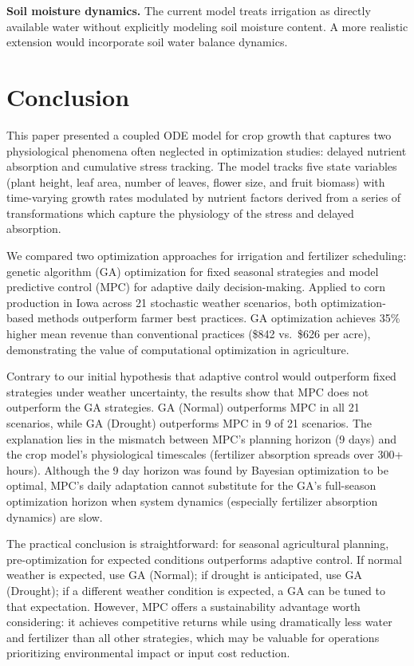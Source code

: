 \documentclass[preprint,12pt]{elsarticle}
\begin{document}
\textbf{Soil moisture dynamics.} The current model treats irrigation as directly available water without explicitly modeling soil moisture content. A more realistic extension would incorporate soil water balance dynamics.

\section{Conclusion}\label{sec:conclusion}

This paper presented a coupled ODE model for crop growth that captures two physiological phenomena often neglected in optimization studies: delayed nutrient absorption and cumulative stress tracking. The model tracks five state variables (plant height, leaf area, number of leaves, flower size, and fruit biomass) with time-varying growth rates modulated by nutrient factors derived from a series of transformations which capture the physiology of the stress and delayed absorption.

We compared two optimization approaches for irrigation and fertilizer scheduling: genetic algorithm (GA) optimization for fixed seasonal strategies and model predictive control (MPC) for adaptive daily decision-making. Applied to corn production in Iowa across 21 stochastic weather scenarios, both optimization-based methods outperform farmer best practices. GA optimization achieves 35\% higher mean revenue than conventional practices (\$842 vs.\ \$626 per acre), demonstrating the value of computational optimization in agriculture.

Contrary to our initial hypothesis that adaptive control would outperform fixed strategies under weather uncertainty, the results show that MPC does not outperform the GA strategies. GA (Normal) outperforms MPC in all 21 scenarios, while GA (Drought) outperforms MPC in 9 of 21 scenarios. The explanation lies in the mismatch between MPC's planning horizon (9 days) and the crop model's physiological timescales (fertilizer absorption spreads over 300+ hours). Although the 9 day horizon was found by Bayesian optimization to be optimal, MPC's daily adaptation cannot substitute for the GA's full-season optimization horizon when system dynamics (especially fertilizer absorption dynamics) are slow.

The practical conclusion is straightforward: for seasonal agricultural planning, pre-optimization for expected conditions outperforms adaptive control. If normal weather is expected, use GA (Normal); if drought is anticipated, use GA (Drought); if a different weather condition is expected, a GA can be tuned to that expectation. However, MPC offers a sustainability advantage worth considering: it achieves competitive returns while using dramatically less water and fertilizer than all other strategies, which may be valuable for operations prioritizing environmental impact or input cost reduction.
\end{document}
